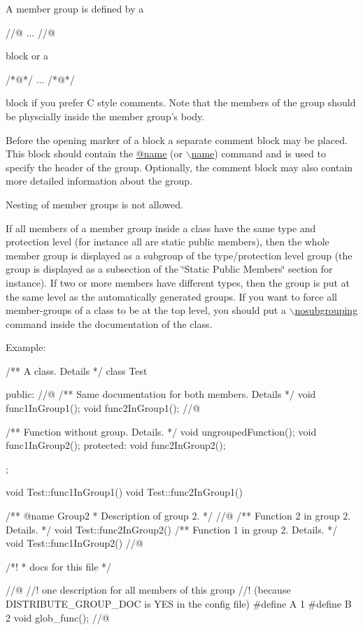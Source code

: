 A member group is defined by a \begin{DoxyVerb}
//@{ 
  ...
//@}
\end{DoxyVerb}
 block or a \begin{DoxyVerb}
/*@{*/ 
  ... 
/*@}*/ 
\end{DoxyVerb}
 block if you prefer C style comments. Note that the members of the group should be physcially inside the member group's body.

Before the opening marker of a block a separate comment block may be placed. This block should contain the \hyperlink{commands_cmdname}{@name} (or \hyperlink{commands_cmdname}{$\backslash$name}) command and is used to specify the header of the group. Optionally, the comment block may also contain more detailed information about the group.

Nesting of member groups is not allowed.

If all members of a member group inside a class have the same type and protection level (for instance all are static public members), then the whole member group is displayed as a subgroup of the type/protection level group (the group is displayed as a subsection of the \char`\"{}Static Public Members\char`\"{} section for instance). If two or more members have different types, then the group is put at the same level as the automatically generated groups. If you want to force all member-\/groups of a class to be at the top level, you should put a \hyperlink{commands_cmdnosubgrouping}{$\backslash$nosubgrouping} command inside the documentation of the class.

\begin{DoxyParagraph}{Example:}

\begin{DoxyVerbInclude}
/** A class. Details */
class Test
{
  public:
    //@{
    /** Same documentation for both members. Details */
    void func1InGroup1();
    void func2InGroup1();
    //@}

    /** Function without group. Details. */
    void ungroupedFunction();
    void func1InGroup2();
  protected:
    void func2InGroup2();
};

void Test::func1InGroup1() {}
void Test::func2InGroup1() {}

/** @name Group2
 *  Description of group 2. 
 */
//@{
/** Function 2 in group 2. Details. */
void Test::func2InGroup2() {}
/** Function 1 in group 2. Details. */
void Test::func1InGroup2() {}
//@}

/*! \file 
 *  docs for this file
 */

//@{
//! one description for all members of this group 
//! (because DISTRIBUTE_GROUP_DOC is YES in the config file)
#define A 1
#define B 2
void glob_func();
//@}
\end{DoxyVerbInclude}

\end{DoxyParagraph}


